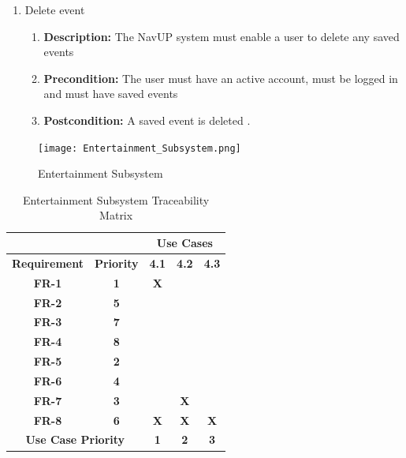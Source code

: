 \documentclass{article}
\begin{document}
\begin{enumerate}
\begin{enumerate}
		\item Delete event
		\begin{enumerate}
			\item \textbf{Description:} The NavUP system must enable a user to delete any saved events
			\item \textbf{Precondition:} The user must have an active account, must be logged in and must have saved events
			\item \textbf{Postcondition:} A saved event is deleted .\newline
		\end{enumerate}
	\end{enumerate}
	\begin{figure}[H]
		\texttt{[image: Entertainment\_Subsystem.png]}
		\caption{Entertainment Subsystem}	
	\end{figure}
	\begin{table}[H]
\centering
\caption{Entertainment Subsystem Traceability Matrix}
\label{my-label}
\begin{tabular}{|c|c|c|c|c|l|l|}
\hline
\multicolumn{2}{|c|}{}                           & \multicolumn{5}{c|}{\textbf{Use Cases}}                           \\ \hline
\textbf{Requirement}     & \textbf{Priority}     & \textbf{4.1}  & \textbf{4.2}  & \multicolumn{3}{c|}{\textbf{4.3}} \\ \hline
\textbf{FR-1}            & \textbf{1}            & \textbf{X}    & \textbf{}     & \multicolumn{3}{c|}{\textbf{}}    \\ \hline
\textbf{FR-2}            & \textbf{5}            & \textbf{}     & \textbf{}     & \multicolumn{3}{c|}{\textbf{}}    \\ \hline
\textbf{FR-3}            & \textbf{7}            & \textbf{}     & \textbf{}     & \multicolumn{3}{c|}{\textbf{}}    \\ \hline
\textbf{FR-4}            & \textbf{8}            & \textbf{}     & \textbf{}     & \multicolumn{3}{c|}{\textbf{}}    \\ \hline
\textbf{FR-5}            & \textbf{2}            & \textbf{}     & \textbf{}     & \multicolumn{3}{c|}{\textbf{}}    \\ \hline
\textbf{FR-6}            & \textbf{4}            & \textbf{}     & \textbf{}     & \multicolumn{3}{c|}{\textbf{}}    \\ \hline
\textbf{FR-7}            & \textbf{3}            & \textbf{}     & \textbf{X}    & \multicolumn{3}{c|}{\textbf{}}    \\ \hline
\textbf{FR-8}            & \textbf{6}            & \textbf{X}    & \textbf{X}    & \multicolumn{3}{c|}{\textbf{X}}   \\ \hline
\multicolumn{2}{|c|}{\textbf{Use Case Priority}} & \textbf{1}    & \textbf{2}    & \multicolumn{3}{c|}{\textbf{3}}   \\ \hline
\end{tabular}
\end{table}	 
 

\end{enumerate}
\end{document}
